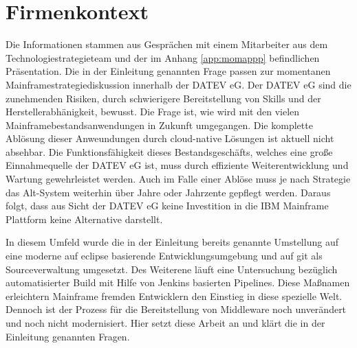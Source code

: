 \chapter{Firmenkontext}\label{ch:Firmenkontext}
Die Informationen stammen aus Gesprächen mit einem Mitarbeiter aus dem Technologiestrategieteam und der im Anhang \ref{app:momappp} befindlichen Präsentation.
Die in der Einleitung genannten Frage passen zur momentanen Mainframestrategiediskussion innerhalb der DATEV eG.
Der DATEV eG sind die zunehmenden Risiken, durch schwierigere Bereitstellung von Skills und der Herstellerabhänigkeit, bewusst.
Die Frage ist, wie wird mit den vielen Mainframebestandsanwendungen in Zukunft umgegangen.
Die komplette Ablösung dieser Anweundungen durch cloud-native Lösungen ist aktuell nicht absehbar.
Die Funktionsfähigkeit dieses Bestandsgeschäfts, welches eine große Einnahmequelle der DATEV eG ist, muss durch effiziente Weiterentwicklung und Wartung gewehrleistet werden.
Auch im Falle einer Ablöse muss je nach Strategie das Alt-System weiterhin über Jahre oder Jahrzente gepflegt werden.
Daraus folgt, dass aus Sicht der DATEV eG keine Investition in die IBM Mainframe Plattform keine Alternative darstellt.

In diesem Umfeld wurde die in der Einleitung bereits genannte Umstellung auf eine moderne auf eclipse basierende Entwicklungsumgebung und auf git als Sourceverwaltung umgesetzt.
Des Weiterene läuft eine Untersuchung bezüglich automatisierter Build mit Hilfe von Jenkins basierten Pipelines.
Diese Maßnamen erleichtern Mainframe fremden Entwicklern den Einstieg in diese spezielle Welt.
Dennoch ist der Prozess für die Bereitstellung von Middleware noch unverändert und noch nicht modernisiert.
Hier setzt diese Arbeit an und klärt die in der Einleitung genannten Fragen.


